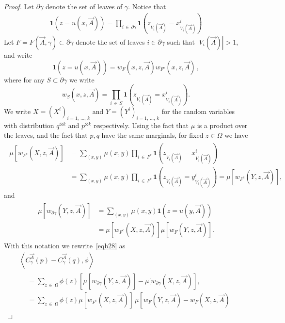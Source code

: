 \documentclass[10pt,a4paper]{article}
\newcommand{\ind}{\mathbf{1}}
\let\g=\gamma
\let\O=\Omega
\begin{document}
\begin{proof}
Let $\partial\g$ denote the set of leaves of $\g$. Notice that
\begin{gather*}
\ind(z=u(x,\vec A)) =
\prod_{i\,\in\,\partial \g}
\ind(z_{V_i(\vec A)}=x^i_{V_i(\vec A)})
\end{gather*}
Let $F=F(\vec A,\g)\subset \partial \g$ denote the set of leaves $i\in \partial \g$ such that $|V_i(\vec A)|> 1$, and write
\[
\ind(z=u(x,\vec A)) = w_F (x,z,\vec A) w_{F^c}(x,z,\vec A)\,,
\]
where for any $S\subset \partial \g$ we write
\begin{equation}\label{defwS}
w_S(x,z,\vec A) = \prod_{i\,\in\,S}
\ind(z_{V_i(\vec A)}=x^i_{V_i(\vec A)}).
\end{equation}
We write $X=(X^i)_{i=1,\,\dots,\,k}$ and $Y=(Y^i)_{i=1,\,\dots,\,k}$ for the random variables with distribution $q^{\otimes k}$ and $p^{\otimes k}$ respectively. Using the fact that $\mu$ is a product over the leaves, and the fact that $p,q$ have the same marginals, for fixed $z\in\O$ we have
\begin{align}\label{eq282a}
\begin{split}
\mu\left[w_{F^c} \left(X,z,\vec A\right)\right]&=\sum_{(x,y)}\mu(x,y) \prod_{i\,\in\, F^c}
\ind\left(z_{V_i(\vec A)}=x^i_{V_i(\vec A)}\right) \\
&= \sum_{(x,y)}\mu(x,y) \prod_{i\,\in\,F^c}
\ind\left(z_{V_i(\vec A)}=y^i_{V_i(\vec A)}\right) =
\mu\left[w_{F^c} (Y,z,\vec A)\right],
\end{split}
\end{align}
and
\begin{align}\label{eq282}
\begin{split}
\mu\left[w_{\partial \g}\left(Y,z,\vec A\right)\right]&=\sum_{(x,y)}\mu(x,y)
\ind\left(z=u(y,\vec A)\right)\\
&=\mu\left[w_{F^c} \left(X,z,\vec A\right)\right]\mu\left[w_F \left(Y,z,\vec A\right)\right].
\end{split}
\end{align}
With this notation we rewrite~\eqref{eqb28} as
\begin{multline}\label{eqbb28}
\left\langle C^{\vec A}_{\gamma}(p)-C^{\vec A}_{\gamma}(q),\phi\right\rangle\\
\begin{aligned}
&=
\sum_{z\,\in\,\Omega} \phi(z) \left[
\mu[w_{\partial \g}\left(Y,z,\vec A\right)] - \mu[w_{\partial \g}\left(X,z,\vec A\right)\right],
\\
&=
\sum_{z\,\in\,\Omega} \phi(z)
\mu\left[w_{F^c} \left(X,z,\vec A\right)\right]\,\mu\left[w_F \left(Y,z,\vec A\right)-w_F \left(X,z,\vec A\right)

\end{aligned}
\end{multline}
\end{proof}
\end{document}
